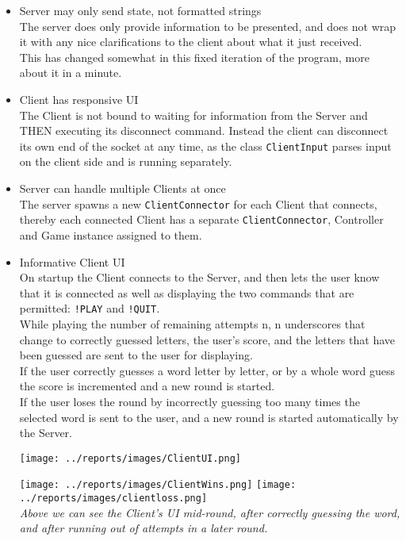 \documentclass[a4paper]{scrartcl}
\begin{document}
\begin{itemize}
{	}
	\item{
		Server may only send state, not formatted strings\\
		The server does only provide information to be presented, and does not wrap it with any nice clarifications to the client about what it just received.\\
		This has changed somewhat in this fixed iteration of the program, more about it in a minute.
	}
	\item{
		Client has responsive UI\\
		The Client is not bound to waiting for information from the Server and THEN executing its disconnect command. Instead the client can disconnect its own end of the socket at any time, as the class \texttt{ClientInput} parses input on the client side and is running separately.
	}
	\item{
		Server can handle multiple Clients at once\\
		The server spawns a new \texttt{ClientConnector} for each Client that connects, thereby each connected Client has a separate \texttt{ClientConnector}, Controller and Game instance assigned to them.
	}
	\item{
		Informative Client UI\\
		On startup the Client connects to the Server, and then lets the user know that it is connected as well as displaying the two commands that are permitted: \texttt{!PLAY} and \texttt{!QUIT}.\\
		While playing the number of remaining attempts n, n underscores that change to correctly guessed letters, the user’s score, and the letters that have been guessed are sent to the user for displaying.\\
	If the user correctly guesses a word letter by letter, or by a whole word guess the score is incremented and a new round is started.\\
	If the user loses the round by incorrectly guessing too many times the selected word is sent to the user, and a new round is started automatically by the Server.
	
	\texttt{[image: ../reports/images/ClientUI.png]}
	
	\texttt{[image: ../reports/images/ClientWins.png]} \texttt{[image: ../reports/images/clientloss.png]}\\
	\emph{Above we can see the Client's UI mid-round, after correctly guessing the word, and after running out of attempts in a later round.}
	}
\end{itemize}
\end{document}
